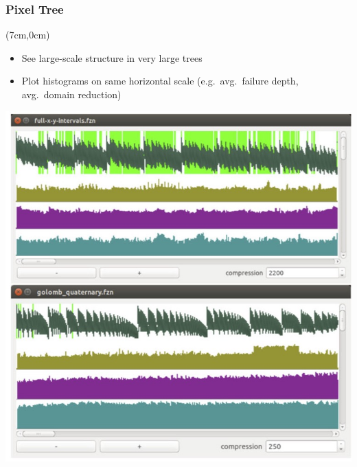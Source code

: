 \begin{frame}
  \frametitle{Pixel Tree \cite{DBLP:journals/constraints/ShishmarevMTB16}}
  
  \begin{textblock*}{8cm}(7cm,0cm)
  \begin{itemize}
      \item See large-scale structure in very large trees
      \item Plot histograms on same horizontal scale (e.g.\ avg.\ failure depth, avg.\ domain reduction)
  \end{itemize}
  \end{textblock*}
  \includegraphics[height=0.7\textheight]{images/pixeltree.jpg}
  
\end{frame}

    

